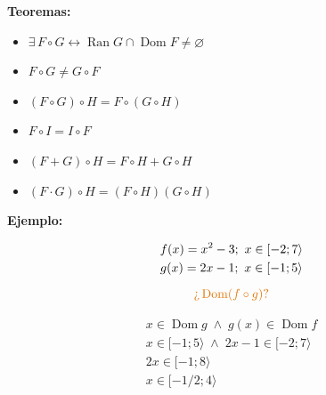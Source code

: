 \documentclass[11pt,a4paper]{article}
\begin{document}
\textbf{Teoremas:}

\begin{minipage}[t]{0.485\textwidth}
\begin{itemize}[label=$\ast$]
  \item $\exists\, F\circ G \leftrightarrow \operatorname{Ran}G \cap \operatorname{Dom}F \neq \varnothing$
  \item $F\circ G \neq G\circ F$
  \item $(F\circ G)\circ H = F\circ(G\circ H)$
\end{itemize}
\end{minipage}\hfill
\begin{minipage}[t]{0.485\textwidth}
\begin{itemize}[label=$\ast$]
  \item $F\circ I = I\circ F$
  \item $(F + G)\circ H = F\circ H + G\circ H$
  \item $(F\cdot G)\circ H = (F\circ H)(G\circ H)$
\end{itemize}
\end{minipage}

\medskip
\textbf{Ejemplo:}

\begin{minipage}[t]{0.436\textwidth}
\begin{gather*}
f(x) = x^2 - 3;\ x \in [-2; 7\rangle\\
g(x) = 2x - 1;\ x \in [-1; 5\rangle\\[6pt]
\textcolor{naranja}{\text{¿}\operatorname{Dom}(f\circ g)\text{?}}
\end{gather*}
\end{minipage}\hfill
\begin{minipage}[t]{0.533\textwidth}
\begin{gather*}
x \in \operatorname{Dom}g \;\wedge\; g(x) \in \operatorname{Dom}f\\
x \in [-1; 5\rangle \;\wedge\; 2x - 1 \in [-2; 7\rangle\\
2x \in [-1; 8\rangle\\
x \in [-1/2; 4\rangle
\end{gather*}
\end{minipage}
\end{document}
